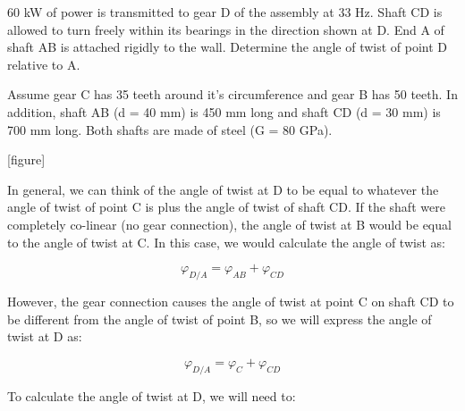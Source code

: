 \documentclass[
  letterpaper,
  DIV=11,
  numbers=noendperiod]{scrreprt}
\begin{document}
\begin{tcolorbox}[enhanced jigsaw, breakable, opacityback=0, toptitle=1mm, left=2mm, colback=white, opacitybacktitle=0.6, colframe=quarto-callout-note-color-frame, titlerule=0mm, arc=.35mm, leftrule=.75mm, bottomtitle=1mm, colbacktitle=quarto-callout-note-color!10!white, rightrule=.15mm, title={Example 6.7: Needs title}, bottomrule=.15mm, toprule=.15mm, coltitle=black]

60 kW of power is transmitted to gear D of the assembly at 33 Hz. Shaft
CD is allowed to turn freely within its bearings in the direction shown
at D. End A of shaft AB is attached rigidly to the wall. Determine the
angle of twist of point D relative to A.

Assume gear C has 35 teeth around it's circumference and gear B has 50
teeth. In addition, shaft AB (d = 40 mm) is 450 mm long and shaft CD (d
= 30 mm) is 700 mm long. Both shafts are made of steel (G = 80 GPa).

{[}figure{]}

\begin{tcolorbox}[enhanced jigsaw, breakable, opacityback=0, toptitle=1mm, left=2mm, colback=white, opacitybacktitle=0.6, colframe=quarto-callout-note-color-frame, titlerule=0mm, arc=.35mm, leftrule=.75mm, bottomtitle=1mm, colbacktitle=quarto-callout-note-color!10!white, rightrule=.15mm, title={Solution}, bottomrule=.15mm, toprule=.15mm, coltitle=black]

In general, we can think of the angle of twist at D to be equal to
whatever the angle of twist of point C is plus the angle of twist of
shaft CD. If the shaft were completely co-linear (no gear connection),
the angle of twist at B would be equal to the angle of twist at C. In
this case, we would calculate the angle of twist as:

\[
\varphi_{D / A}=\varphi_{A B}+\varphi_{C D}
\]

However, the gear connection causes the angle of twist at point C on
shaft CD to be different from the angle of twist of point B, so we will
express the angle of twist at D as:

\[
\varphi_{D / A}=\varphi_C+\varphi_{C D}
\]

To calculate the angle of twist at D, we will need to:


\end{tcolorbox}
\end{tcolorbox}
\end{document}
